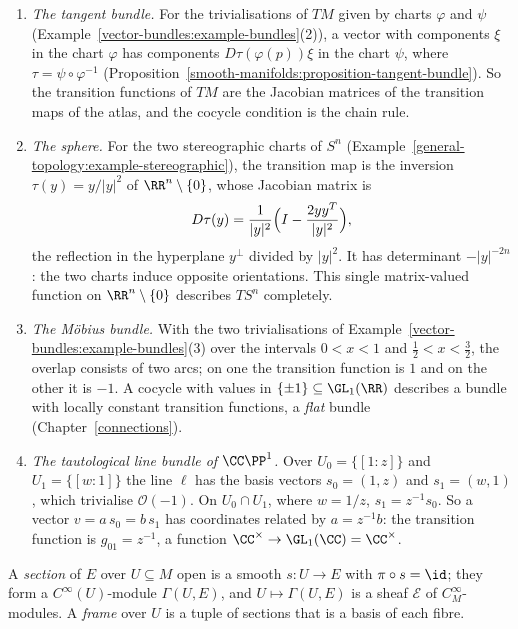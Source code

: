 \begin{example}\label{vector-bundles:example-cocycles}
\begin{enumerate}
\item \emph{The tangent bundle.} For the trivialisations of $TM$ given by charts $\varphi$ and $\psi$ (Example~\ref{vector-bundles:example-bundles}(2)), a vector with components
$\xi$ in the chart $\varphi$ has components $D\tau(\varphi(p))\xi$ in the chart $\psi$, where $\tau = \psi \circ \varphi^{-1}$ (Proposition~\ref{smooth-manifolds:proposition-tangent-bundle}).
So the transition functions of $TM$ are the Jacobian matrices of the transition maps of the atlas, and the cocycle condition is the chain rule.
\item \emph{The sphere.} For the two stereographic charts of $S^n$ (Example~\ref{general-topology:example-stereographic}), the transition map is the inversion
$\tau(y) = y/|y|^2$ of $\RR^n \setminus \{0\}$, whose Jacobian matrix is
\[
D\tau(y) = \frac{1}{|y|^2}\Bigl(I - \frac{2yy^T}{|y|^2}\Bigr),
\]
the reflection in the hyperplane $y^\perp$ divided by $|y|^2$. It has determinant $-|y|^{-2n}$: the two charts induce opposite orientations. This single matrix-valued function
on $\RR^n \setminus \{0\}$ describes $TS^n$ completely.
\item \emph{The M\"obius bundle.} With the two trivialisations of Example~\ref{vector-bundles:example-bundles}(3) over the intervals $0 < x < 1$ and $\frac12 < x < \frac32$, the overlap
consists of two arcs; on one the transition function is $1$ and on the other it is $-1$. A cocycle with values in $\{\pm1\} \subseteq \GL_1(\RR)$ describes a bundle with locally constant
transition functions, a \emph{flat} bundle (Chapter~\ref{connections}).
\item \emph{The tautological line bundle of $\CC\PP^1$.} Over $U_0 = \{[1 : z]\}$ and $U_1 = \{[w : 1]\}$ the line $\ell$ has the basis vectors $s_0 = (1, z)$ and $s_1 = (w, 1)$, which
trivialise $\mathcal{O}(-1)$. On $U_0 \cap U_1$, where $w = 1/z$, $s_1 = z^{-1}s_0$. So a vector $v = a\,s_0 = b\,s_1$ has coordinates related by $a = z^{-1}b$: the transition function
is $g_{01} = z^{-1}$, a function $\CC^\times \to \GL_1(\CC) = \CC^\times$.
\end{enumerate}
\end{example}

\begin{definition}\label{vector-bundles:definition-sections}
A \emph{section} of $E$ over $U \subseteq M$ open is a smooth $s \colon U \to E$ with $\pi \circ s = \id$; they form a $C^\infty(U)$-module $\Gamma(U, E)$, and $U \mapsto \Gamma(U, E)$ is a sheaf
$\mathcal{E}$ of $C^\infty_M$-modules. A \emph{frame} over $U$ is a tuple of sections that is a basis of each fibre.
\end{definition}

